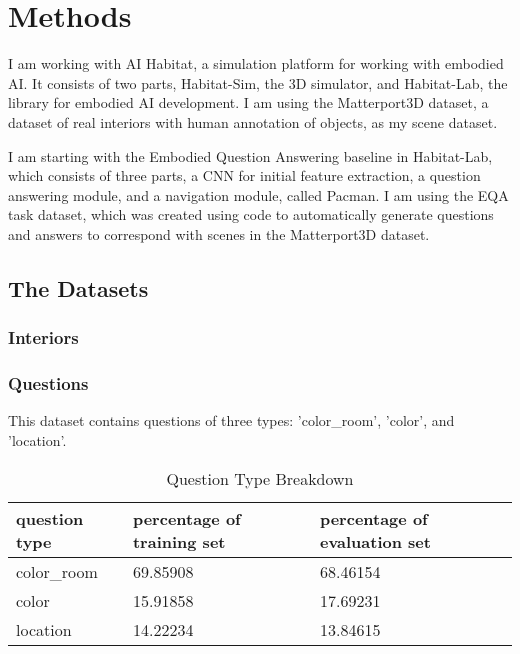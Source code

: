 \chapter{Methods}
I am working with AI Habitat, a simulation platform for working with embodied AI\cite{habitat19iccv}. It consists of two parts, Habitat-Sim, the 3D simulator, and Habitat-Lab, the library for embodied AI development. I am using the Matterport3D dataset, a dataset of real interiors with human annotation of objects, as my scene dataset\cite{matterport}.

I am starting with the Embodied Question Answering baseline in Habitat-Lab, which consists of three parts, a CNN for initial feature extraction, a question answering module, and a navigation module, called Pacman\cite{embodiedqa}. I am using the EQA task dataset, which was created using code to automatically generate questions and answers to correspond with scenes in the Matterport3D dataset\cite{eqa_matterport}. 

\section{The Datasets}
\subsection{Interiors}

\subsection{Questions} 
This dataset contains questions of three types: 'color\_room', 'color', and 'location'. 
\begin{table}[h]
\centering
\caption{Question Type Breakdown}
\begin{tabular}{ |l|l|l| }
\hline
\textbf{question type} & \textbf{percentage of training set} & \textbf{percentage of evaluation set} \\
\hline
color\_room & 69.85908 & 68.46154\\
color & 15.91858 & 17.69231\\
location & 14.22234 & 13.84615\\
\hline
\end{tabular}
\label{tab:q_breakdown}
\end{table}


